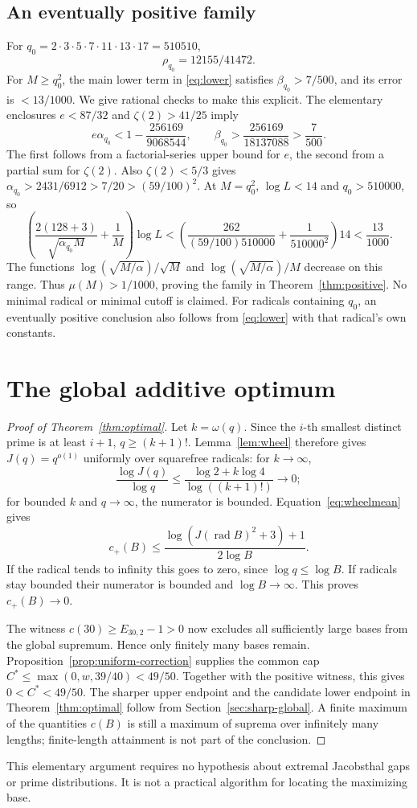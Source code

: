 \documentclass[11pt]{article}
\theoremstyle{definition}\newtheorem{definition}[theorem]{Definition}
\theoremstyle{remark}\newtheorem{remark}[theorem]{Remark}
\newcommand{\rad}{\operatorname{rad}}
\begin{document}
\subsection{An eventually positive family}
For \(q_0=2\cdot3\cdot5\cdot7\cdot11\cdot13\cdot17=510510\),
\[
 \rho_{q_0}=12155/41472.
\]
For \(M\ge q_0^2\), the main lower term in \eqref{eq:lower} satisfies
\(\beta_{q_0}>7/500\), and its error is \(<13/1000\).
We give rational checks to make this explicit.
The elementary enclosures \(e<87/32\) and \(\zeta(2)>41/25\)
imply
\[
 e\alpha_{q_0}<1-\frac{256169}{9068544},\qquad
 \beta_{q_0}>\frac{256169}{18137088}>\frac7{500}.
\]
The first follows from a factorial-series upper bound for \(e\),
the second from a partial sum for \(\zeta(2)\).
Also \(\zeta(2)<5/3\) gives
\(\alpha_{q_0}>2431/6912>7/20>(59/100)^2\).
At \(M=q_0^2\), \(\log L<14\) and \(q_0>510000\), so
\[
 \left(\frac{2(128+3)}{\sqrt{\alpha_{q_0} M}}+\frac1M\right)\log L
 <\left(\frac{262}{(59/100)510000}
               +\frac1{510000^2}\right)14<\frac{13}{1000}.
\]
The functions \(\log(\sqrt{M/\alpha})/\sqrt M\) and
\(\log(\sqrt{M/\alpha})/M\) decrease on this range.
Thus \(\mu(M)>1/1000\), proving the family in
Theorem~\ref{thm:positive}. No minimal radical or minimal cutoff is claimed.
For radicals containing \(q_0\), an eventually positive conclusion also
follows from \eqref{eq:lower} with that radical's own constants.

\section{The global additive optimum}
\begin{proof}[Proof of Theorem~\ref{thm:optimal}]
Let \(k=\omega(q)\). Since the \(i\)-th smallest distinct prime is at
least \(i+1\), \(q\ge(k+1)!\).
Lemma~\ref{lem:wheel} therefore gives \(J(q)=q^{o(1)}\) uniformly
over squarefree radicals: for \(k\to\infty\),
\[
 \frac{\log J(q)}{\log q}
 \le\frac{\log2+k\log4}{\log((k+1)!)}\longrightarrow0;
\]
for bounded \(k\) and \(q\to\infty\), the numerator is bounded.
Equation~\eqref{eq:wheelmean} gives
\[
 c_+(B)\le\frac{\log(J(\rad B)^2+3)+1}{2\log B}.
\]
If the radical tends to infinity this goes to zero, since
\(\log q\le\log B\). If radicals stay bounded their numerator is bounded
and \(\log B\to\infty\). This proves \(c_+(B)\to0\).

The witness \(c(30)\ge E_{30,2}-1>0\) now excludes all sufficiently large
bases from the global supremum. Hence only finitely many bases remain.
Proposition~\ref{prop:uniform-correction} supplies the common cap
\(C^*\le\max(0,w,39/40)<49/50\). Together with the positive witness,
this gives \(0<C^*<49/50\). The sharper upper endpoint and the candidate
lower endpoint in Theorem~\ref{thm:optimal} follow from
Section~\ref{sec:sharp-global}.
A finite maximum of the quantities \(c(B)\) is still a maximum of
suprema over infinitely many lengths; finite-length attainment is not
part of the conclusion.
\end{proof}
This elementary argument requires no hypothesis about extremal
Jacobsthal gaps or prime distributions. It is not a practical algorithm
for locating the maximizing base.
\end{document}
